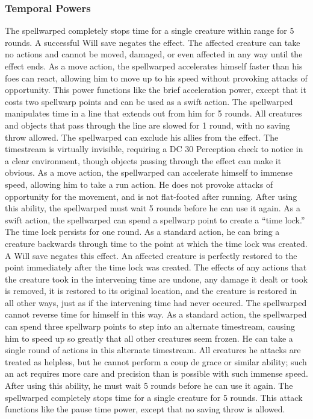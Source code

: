 \subsubsection{Temporal Powers}
 The spellwarped completely stops time for a single creature within \rngclose range for 5 rounds. A successful Will save negates the effect. The affected creature can take no actions and cannot be moved, damaged, or even affected in any way until the effect ends.
 As a move action, the spellwarped accelerates himself faster than his foes can react, allowing him to move up to his speed without provoking attacks of opportunity.
 This power functions like the brief acceleration power, except that it costs two spellwarp points and can be used as a swift action.
 The spellwarped manipulates time in a \arealarge line that extends out from him for 5 rounds. All creatures and objects that pass through the line are slowed for 1 round, with no saving throw allowed. The spellwarped can exclude his allies from the effect. The timestream is virtually invisible, requiring a DC 30 Perception check to notice in a clear environment, though objects passing through the effect can make it obvious.
 As a move action, the spellwarped can accelerate himself to immense speed, allowing him to take a run action. He does not provoke attacks of opportunity for the movement, and is not flat-footed after running. After using this ability, the spellwarped must wait 5 rounds before he can use it again.
 As a swift action, the spellwarped can spend a spellwarp point to create a ``time lock.'' The time lock persists for one round. As a standard action, he can bring a creature backwards through time to the point at which the time lock was created. A Will save negates this effect. An affected creature is perfectly restored to the point immediately after the time lock was created. The effects of any actions that the creature took in the intervening time are undone, any damage it dealt or took is removed, it is restored to its original location, and the creature is restored in all other ways, just as if the intervening time had never occured. The spellwarped cannot reverse time for himself in this way.
 As a standard action, the spellwarped can spend three spellwarp points to step into an alternate timestream, causing him to speed up so greatly that all other creatures seem frozen. He can take a single round of actions in this alternate timestream. All creatures he attacks are treated as helpless, but he cannot perform a coup de grace or similar ability; such an act requires more care and precision than is possible with such immense speed. After using this ability, he must wait 5 rounds before he can use it again.
 The spellwarped completely stops time for a single creature for 5 rounds. This attack functions like the pause time power, except that no saving throw is allowed.

